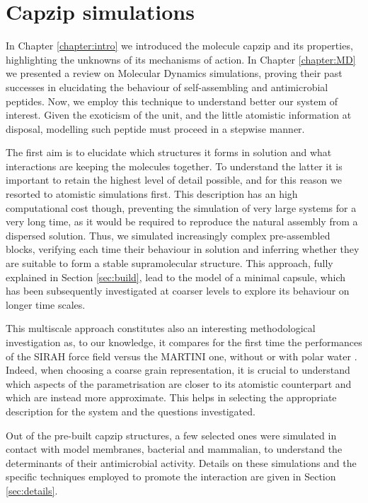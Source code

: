 \chapter{Capzip simulations} \label{chapter:capzip_results}

In Chapter \ref{chapter:intro} we introduced the molecule capzip and its properties, highlighting the unknowns of its mechanisms of action. In Chapter \ref{chapter:MD} we presented a review on Molecular Dynamics simulations, proving their past successes in elucidating the behaviour of self-assembling and antimicrobial peptides.
%
Now, we employ this technique to understand better our system of interest. Given the exoticism of the unit, and the little atomistic information at disposal, modelling such peptide must proceed in a stepwise manner.

The first aim is to elucidate which structures it forms in solution and what interactions are keeping the molecules together. To understand the latter it is important to retain the highest level of detail possible, and for this reason we resorted to atomistic simulations first.
%
This description has an high computational cost though, preventing the simulation of very large systems for a very long time, as it would be required to reproduce the natural assembly from a dispersed solution.
%
Thus, we simulated increasingly complex pre-assembled blocks, verifying each time their behaviour in solution and inferring whether they are suitable to form a stable supramolecular structure. This approach, fully explained in Section \ref{sec:build}, lead to the model of a minimal capsule, which has been subsequently investigated at coarser levels to explore its behaviour on longer time scales.

This multiscale approach constitutes also an interesting methodological investigation as, to our knowledge, it compares for the first time the performances of the SIRAH force field \citep{Machado2018} versus the MARTINI \citep{Marrink2007, Monticelli2008} one, without or with polar water \citep{Yesylevskyy2010}. Indeed, when choosing a coarse grain representation, it is crucial to understand which aspects of the parametrisation are closer to its atomistic counterpart and which are instead more approximate. This helps in selecting the appropriate description for the system and the questions investigated.

Out of the pre-built capzip structures, a few selected ones were simulated in contact with model membranes, bacterial and mammalian, to understand the determinants of their antimicrobial activity. Details on these simulations and the specific techniques employed to promote the interaction are given in Section \ref{sec:details}.

